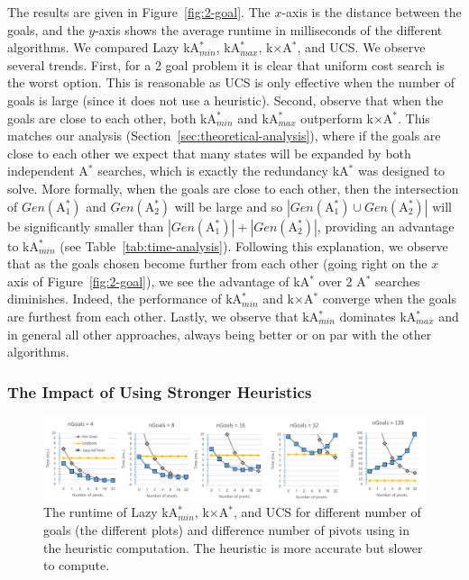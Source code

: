 \documentclass{aicom2e}
\newcommand{\astar}{A$^*$}
\newcommand{\kastar}{kA$^*$}
\newcommand{\kastarmin}{kA$^*_{min}$}
\newcommand{\kastarmax}{kA$^*_{max}$}
\newcommand{\kxastar}{k$\times$A$^*$}
\newcommand{\astari}[1]{A$^*_#1$}
\begin{document}
The results are given in Figure~\ref{fig:2-goal}. The $x$-axis is the distance between the goals, and the $y$-axis shows the average runtime in milliseconds of the different algorithms. We compared Lazy \kastarmin{}, \kastarmax{}, \kxastar{}, and UCS. 
We observe several trends.
First, for a 2 goal problem it is clear that uniform cost search is the worst option. 
This is reasonable as UCS is only effective when the number of goals is large (since it does not use a heuristic). %
Second, observe that when the goals are close to each other, both \kastarmin{}
and \kastarmax{} outperform \kxastar{}. This matches our analysis (Section~\ref{sec:theoretical-analysis}), where if the goals are close to each other we expect that many states will be expanded by both independent \astar{} searches, which is  exactly the redundancy \kastar{} was designed to solve. More formally, 
when the goals are close to each other, then the intersection of $Gen(\text{\astari{1}})$ and $Gen(\text{\astari{2}})$ will be large and so $|Gen(\text{\astari{1}})\cup Gen(\text{\astari{2}})|$ will be significantly smaller than $|Gen(\text{\astari{1}})|+|Gen(\text{\astari{2}})|$, providing an advantage to \kastarmin{} (see Table~\ref{tab:time-analysis}). 
Following this explanation, we observe that as the goals chosen become further from each other (going right on the $x$ axis of Figure~\ref{fig:2-goal}), we see the advantage of \kastar{} over 2 \astar{} searches diminishes. Indeed, the performance of \kastarmin{}  and \kxastar{} converge when the goals are furthest from each other.
Lastly, we observe that \kastarmin{} dominates \kastarmax{} and in general all other approaches, always being better or on par with the other algorithms.

\subsubsection{The Impact of Using Stronger Heuristics}

\begin{figure}
	\includegraphics[width=\textwidth]{heuristic-power_cropped.pdf}
	\caption{The runtime of Lazy \kastarmin{}, \kxastar{}, and UCS for different number of goals (the different plots) and difference number of pivots using in the heuristic computation. The heuristic is more accurate but slower to compute.}
	\label{fig:dh-results}
\end{figure}
\end{document}
